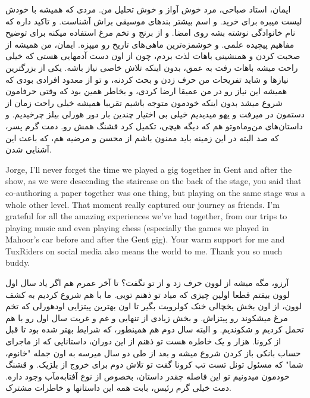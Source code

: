 \begin{flushright}
\foreignlanguage{persian}
{
ایمان، استاد صباحی، مرد خوش آواز و خوش تحلیل من. مردی که همیشه با خودش لیست میبره برای خرید. و اسم بیشتر بندهای موسیقی براش آشناست. و تاکید داره که نام خانوادگی نوشته بشه روی امضا. و از برنج و تخم مرغ استفاده میکنه برای توضیح مفاهیم پیچیده علمی. و خوشمزه‌ترین ماهی‌های تاریخ رو میپزه. ایمان، من همیشه از صحبت کردن و همنشینی باهات لذت بردم، چون از اون دست آدمهایی هستی که خیلی راحت میشه باهات رفت به عمق، بدون اینکه تلاش خاصی نیاز باشه. یکی از بزرگترین نیازها و شاید تفریحات من حرف زدن و بحث کردنه، و تو از معدود افرادی بودی که همیشه این نیاز رو در من عمیقا ارضا کردی، و بخاطر همین بود که وقتی حرفامون شروع میشد بدون اینکه خودمون متوجه باشیم تقریبا همیشه خیلی راحت زمان از دستمون در میرفت و یهو میدیدیم خیلی بی اختیار چندین بار دور هورلی بیلز چرخیدیم. و داستان‌های من‌وماه‌وتو هم که دیگه هیچی، تکمیل کرد قشنگ همش رو. دمت گرم پسر، که صد البته در این زمینه باید ممنون باشم از محسن و مرضیه هم، که باعث این آشنایی شدن.
}
\end{flushright}

Jorge, I'll never forget the time we played a gig together in Gent and after the show, as we were descending the staircase on the back of the stage, you said that co-authoring a paper together was one thing, but playing on the same stage was a whole other level. That moment really captured our journey as friends. I'm grateful for all the amazing experiences we've had together, from our trips to playing music and even playing chess (especially the games we played in Mahoor’s car before and after the Gent gig).  Your warm support for me and TuxRiders on social media also means the world to me. Thank you so much buddy.

\begin{flushright}
\foreignlanguage{persian}
{
آرزو، مگه میشه از لوون حرف زد و از تو نگفت؟ تا آخر عمرم هم اگر یاد سال اول لوون بیفتم قطعا اولین چیزی که میاد تو ذهنم تویی. ما با هم شروع کردیم به کشف لوون، از اون بخش یخچالی خنک کولرویت بگیر تا اون بهترین پیتزایی اودهورلی که تخم مرغ میشکوند رو پیتزاش. و بخش زیادی از تنهایی و غم و غربت سال اول رو با هم تحمل کردیم و شکوندیم. و البته سال دوم هم همینطور، که شرایط بهتر شده بود تا قبل از کرونا. هزار و یک خاطره هست تو ذهنم از این دوران، داستانایی که از ماجرای حساب بانکی باز کردن شروع میشه و بعد از طی دو سال میرسه به اون جمله "خانوم، شما" که مسئول تونل تست تب کرونا گفت تو تلاش دوم برای خروج از بلژیک. و قشنگ خودمون میدونیم تو این فاصله چقدر داستان، بخصوص از نوع آفتابه‌مآب وجود داره. دمت خیلی گرم رئیس، بابت همه این داستانها و خاطرات مشترک.
}
\end{flushright}

